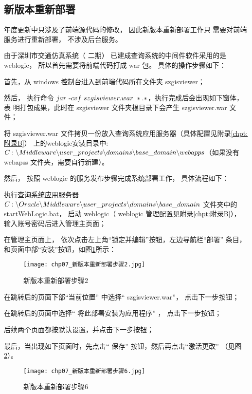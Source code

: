 \subsection{新版本重新部署}
\pyear 年度更新中只涉及了前端源代码的修改， 因此新版本重新部署工作只
需要对前端服务进行重新部署， 不涉及后台服务。

由于深圳市交通仿真系统（ 二期） 已建成查询系统的中间件软件采用的是
weblogic， 所以首先需要将前端代码打成 war 包。 具体的操作步骤如下：

\begin{nbeae}
\item 首先，从 windows 控制台进入到前端代码所在文件夹 szgisviewer；
\item 然后， 执行命令 $jar \ {\text -} cvf \ szgisviewer.war \ *.*$，执行完成后会出现如下窗体， 表
明打包成果，此时在 szgisviewer 文件夹根目录下会产生 szgisviewer.war 文件；

\item 将 szgisviewer.war 文件拷贝一份放入查询系统应用服务器（具体配置见附录\ref{chpt:附录B}）
上的weblogic安装目录中: $C:\backslash Middleware\backslash user\_projects\backslash domains\backslash base\_domain\backslash \\ webapps$（如果没有 webapss 文件夹，需要自行新建）。
\end{nbeae}

然后， 按照 weblogic 的服务发布步骤完成系统部署工作， 具体流程如下：

\begin{nbeae}
\item 执行查询系统应用服务器 $C:\backslash Oracle\backslash Middleware\backslash user\_projects\backslash domains\backslash\\ base\_domain$ 文件夹中的 startWebLogic.bat， 
启动 weblogic（ weblogic 管理配置见附录\ref{chpt:附录B}）， 输入账号密码后进入管理主页面；

\item 在管理主页面上， 依次点击左上角“锁定并编辑”按钮，左边导航栏“部署”
条目，和页面中部“安装”按钮，如图\ref{fig:chp07_新版本重新部署步骤2}所示：

\begin{figure}[!ht]
  \centering
  \texttt{[image: chp07\_新版本重新部署步骤2.jpg]}
  \caption{新版本重新部署步骤2\label{fig:chp07_新版本重新部署步骤2} }
\end{figure}

\item 在跳转后的页面下部“当前位置” 中选择“ szgisviewer.war”， 点击下一步按钮；
\item 在跳转后的页面中选择“ 将此部署安装为应用程序” ， 点击下一步按钮；
\item 后续两个页面都按默认设置，并点击下一步按钮；
\item 最后，当出现如下页面时，先点击“ 保存” 按钮，然后再点击“激活更改”
（见图\ref{fig:chp07_新版本重新部署步骤6}）。

\clearpage

\begin{figure}[!ht]
  \centering
  \texttt{[image: chp07\_新版本重新部署步骤6.jpg]}
  \caption{新版本重新部署步骤6\label{fig:chp07_新版本重新部署步骤6} }
\end{figure}
\end{nbeae}

